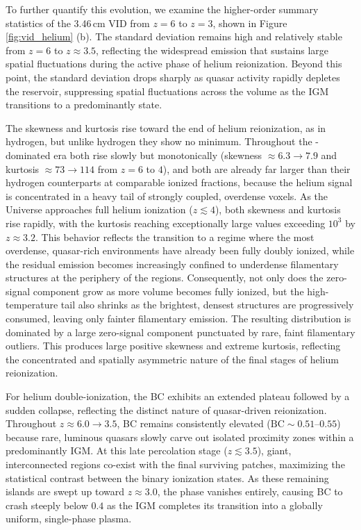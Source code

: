 \documentclass[apj,twocolumn, appendixfloats, twocolappendix, numberedappendix, tighten]{openjournal}
\begin{document}
To further quantify this evolution, we examine the higher-order summary statistics of the 3.46\,cm VID from $z = 6$ to $z = 3$, shown in Figure \ref{fig:vid_helium} (b). The standard deviation remains high and relatively stable from $z = 6$ to $z \approx 3.5$, reflecting the widespread  emission that sustains large spatial fluctuations during the active phase of helium reionization. Beyond this point, the standard deviation drops sharply as quasar activity rapidly depletes the  reservoir, suppressing spatial fluctuations across the volume as the IGM transitions to a predominantly  state.


The skewness and kurtosis rise toward the end of helium reionization, as in hydrogen, but unlike hydrogen they show no minimum. Throughout the -dominated era both rise slowly but monotonically (skewness $\approx 6.3 \to 7.9$ and kurtosis $\approx 73 \to 114$ from $z = 6$ to $4$), and both are already far larger than their hydrogen counterparts at comparable ionized fractions, because the helium signal is concentrated in a heavy tail of strongly coupled, overdense voxels. As the Universe approaches full helium ionization ($z \lesssim 4$), both skewness and kurtosis rise rapidly, with the kurtosis reaching exceptionally large values exceeding $10^3$ by $z \approx 3.2$. This behavior reflects the transition to a regime where the most overdense, quasar-rich environments have already been fully doubly ionized, while the residual  emission becomes increasingly confined to underdense filamentary structures at the periphery of the  regions. Consequently, not only does the zero-signal component grow as more volume becomes fully ionized, but the high-temperature tail also shrinks as the brightest, densest  structures are progressively consumed, leaving only fainter filamentary emission. The resulting distribution is dominated by a large zero-signal component punctuated by rare, faint filamentary outliers. This produces large positive skewness and extreme kurtosis, reflecting the concentrated and spatially asymmetric nature of the final stages of helium reionization.


For helium double-ionization, the BC exhibits an extended plateau followed by a sudden collapse, reflecting the distinct nature of quasar-driven reionization. Throughout $z \approx 6.0 \to 3.5$, BC remains consistently elevated ($\mathrm{BC} \sim 0.51$--$0.55$) because rare, luminous quasars slowly carve out isolated  proximity zones within a predominantly  IGM. At this late percolation stage ($z \lesssim 3.5$), giant, interconnected  regions co-exist with the final surviving  patches, maximizing the statistical contrast between the binary ionization states. As these remaining  islands are swept up toward $z \approx 3.0$, the  phase vanishes entirely, causing BC to crash steeply below $0.4$ as the IGM completes its transition into a globally uniform, single-phase  plasma.
\end{document}

